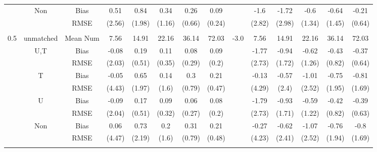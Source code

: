 \begin{tabular}{@{\extracolsep{5pt}}lc|cccccc|lccccc}
 & Non & Bias & 0.51 & 0.84 & 0.34 & 0.26 & 0.09 &  & -1.6 & -1.72 & -0.6 & -0.64 & -0.21 \\
 &  & RMSE & (2.56) & (1.98) & (1.16) & (0.66) & (0.24) &  & (2.82) & (2.98) & (1.34) & (1.45) & (0.64) \\
 &  &  &  &  &  &  &  &  &  &  &  &  &  \\
0.5 & unmatched & Mean Num & 7.56 & 14.91 & 22.16 & 36.14 & 72.03 & -3.0 & 7.56 & 14.91 & 22.16 & 36.14 & 72.03 \\
 & U,T & Bias & -0.08 & 0.19 & 0.11 & 0.08 & 0.09 &  & -1.77 & -0.94 & -0.62 & -0.43 & -0.37 \\
 &  & RMSE & (2.03) & (0.51) & (0.35) & (0.29) & (0.2) &  & (2.73) & (1.72) & (1.26) & (0.82) & (0.64) \\
 & T & Bias & -0.05 & 0.65 & 0.14 & 0.3 & 0.21 &  & -0.13 & -0.57 & -1.01 & -0.75 & -0.81 \\
 &  & RMSE & (4.43) & (1.97) & (1.6) & (0.79) & (0.47) &  & (4.29) & (2.4) & (2.52) & (1.95) & (1.69) \\
 & U & Bias & -0.09 & 0.17 & 0.09 & 0.06 & 0.08 &  & -1.79 & -0.93 & -0.59 & -0.42 & -0.39 \\
 &  & RMSE & (2.04) & (0.51) & (0.32) & (0.27) & (0.2) &  & (2.73) & (1.71) & (1.22) & (0.82) & (0.63) \\
 & Non & Bias & 0.06 & 0.73 & 0.2 & 0.31 & 0.21 &  & -0.27 & -0.62 & -1.07 & -0.76 & -0.8 \\
 &  & RMSE & (4.47) & (2.19) & (1.6) & (0.79) & (0.48) &  & (4.23) & (2.41) & (2.52) & (1.94) & (1.69) \\
 &  &  &  &  &  &  &  &  &  &  &  &  &  \\
\hline 
\bottomrule 
\end{tabular}
